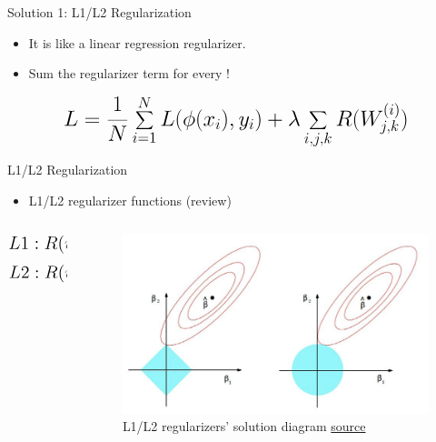 \begin{frame}{Solution 1: L1/L2 Regularization}
    \begin{itemize}
        \item It is like a linear regression regularizer.
        \item Sum the regularizer term for every !
    \end{itemize}
    \vspace{0.2\textheight}
    \begin{equation*}
        \mathlarger{\mathlarger{\mathlarger{
        L = \frac{1}{N} \sum_{i=1}^{N} L(\phi(x_i), y_i) + \lambda \sum_{i,j,k} R(W_{j,k}^{(i)})
        }}}
    \end{equation*}
\end{frame}
\begin{frame}{L1/L2 Regularization}
    \begin{itemize}
        \item L1/L2 regularizer functions (review)
    \end{itemize}
	\begin{columns}
		\begin{column}[c]{0.5\textwidth}
			\centering
			\begin{equation*}
				\centering
				\mathlarger{\mathlarger{
							L1: R(w) = \vert w\vert
				}}
			\end{equation*}
			\begin{equation*}
				\centering
				\mathlarger{\mathlarger{
							L2: R(w) = w^2
				}}
			\end{equation*}
		\end{column}
		\begin{column}[c]{0.5\textwidth}
			\begin{figure}[H]
				\centering
				\includegraphics[width=\textwidth]{Figs/section_4/l1l2_reg.jpeg}
				\caption{L1/L2 regularizers' solution diagram \href{https://towardsdatascience.com/understanding-l1-and-l2-regularization-93918a5ac8d0}{source}}
			\end{figure}
		\end{column}
	\end{columns}
    

\end{frame}
